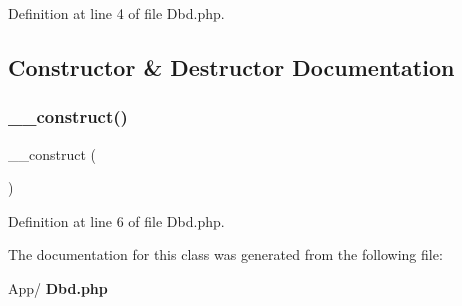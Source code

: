 Definition at line 4 of file Dbd.\+php.



\subsection{Constructor \& Destructor Documentation}
\mbox{\label{class_app_1_1_dbd_a095c5d389db211932136b53f25f39685}} 
\subsubsection{\+\_\+\+\_\+construct()}
{\footnotesize\ttfamily \+\_\+\+\_\+construct (\begin{DoxyParamCaption}{ }\end{DoxyParamCaption})}



Definition at line 6 of file Dbd.\+php.



The documentation for this class was generated from the following file\+:\begin{DoxyCompactItemize}
\item 
App/\textbf{ Dbd.\+php}\end{DoxyCompactItemize}
